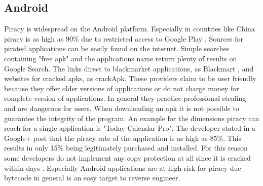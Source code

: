 \subsection{Android} \label{subsection:foundation-piracy-android}
Piracy is widespread on the Android platform. Especially in countries like China piracy is as high as 90\% due to restricted access to Google Play \cite{piracyRate}.
Sources for pirated applications can be easily found on the internet.
Simple searches containing "free apk" and the applications name return plenty of results on Google Search.
The links direct to blackmarket applications, as Blackmart \cite{blackmartStore}, and websites for cracked \gls{apk}s, as crackApk\cite{crackApk}.
These providers claim to be user friendly because they offer older versions of applications or do not charge money for complete version of applications.
In general they practice professional stealing and are dangerous for users.
When downloading an \gls{apk} it is not possible to guarantee the integrity of the program.
\newline
An example for the dimensions piracy can reach for a single application is "Today Calendar Pro".
The developer stated in a Google+ post that the piracy rate of the application is as high as 85\%.
This results in only 15\% being legitimately purchased and installed. \cite{xdaPiracy}\cite{developersPiracy}
\newline
For this reason some developers do not implement any copy protection at all since it is cracked within days \cite{recodeMonument}.
Especially Android applications are at high risk for piracy due bytecode in general is an easy target to reverse engineer.


%




%

